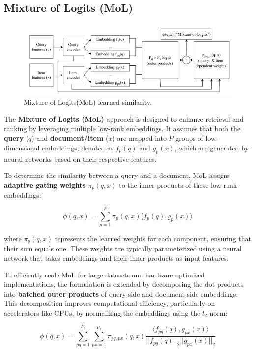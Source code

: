 \subsection{Mixture of Logits (MoL)}
\begin{figure}[h]
	\centering
	\includegraphics[width=0.7\linewidth]{Figures/mol.png}
	\caption{Mixture of Logits(MoL) learned similarity.}
	\label{Mixture_of_Logits }	
\end{figure}
The \textbf{Mixture of Logits (MoL)}\cite{zhai2023revisiting}\cite{Ding2024} approach is designed to enhance retrieval and ranking by leveraging multiple low-rank embeddings. It assumes that both the \textbf{query} (\( q \)) and \textbf{document/item} (\( x \)) are mapped into \( P \) groups of low-dimensional embeddings, denoted as \( f_p(q) \) and \( g_p(x) \), which are generated by neural networks based on their respective features.

To determine the similarity between a query and a document, MoL assigns \textbf{adaptive gating weights} \( \pi_p(q,x) \) to the inner products of these low-rank embeddings\cite{zhai2023revisiting}:

\begin{equation}
	\phi(q,x) = \sum_{p=1}^{P} \pi_p(q,x) \langle f_p(q), g_p(x) \rangle
\end{equation}

where \( \pi_p(q,x) \) represents the learned weights for each component, ensuring that their sum equals one. These weights are typically parameterized using a neural network that takes embeddings and their inner products as input features.

To efficiently scale MoL for large datasets and hardware-optimized implementations, the formulation is extended by decomposing the dot products into \textbf{batched outer products} of query-side and document-side embeddings. This decomposition improves computational efficiency, particularly on accelerators like GPUs, by normalizing the embeddings using the \( l_2 \)-norm:\cite{zhai2023revisiting}

\begin{equation}
	\phi(q,x) = \sum_{pq=1}^{P_q} \sum_{px=1}^{P_x} \pi_{pq,px}(q,x) \frac{\langle f_{pq}(q), g_{px}(x) \rangle}{|| f_{pq}(q) ||_2 || g_{px}(x) ||_2}
\end{equation}


